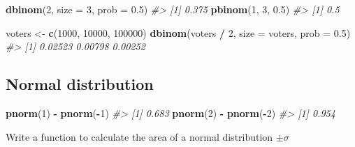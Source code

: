\documentclass[]{book}
\newenvironment{Shaded}{\begin{snugshade}}{\end{snugshade}}
\newcommand{\CommentTok}[1]{\textcolor[rgb]{0.56,0.35,0.01}{\textit{#1}}}
\newcommand{\DataTypeTok}[1]{\textcolor[rgb]{0.13,0.29,0.53}{#1}}
\newcommand{\DecValTok}[1]{\textcolor[rgb]{0.00,0.00,0.81}{#1}}
\newcommand{\FloatTok}[1]{\textcolor[rgb]{0.00,0.00,0.81}{#1}}
\newcommand{\KeywordTok}[1]{\textcolor[rgb]{0.13,0.29,0.53}{\textbf{#1}}}
\newcommand{\NormalTok}[1]{#1}
\newcommand{\OperatorTok}[1]{\textcolor[rgb]{0.81,0.36,0.00}{\textbf{#1}}}
\newcommand{\StringTok}[1]{\textcolor[rgb]{0.31,0.60,0.02}{#1}}
\theoremstyle{definition}
\theoremstyle{definition}
\theoremstyle{definition}
\theoremstyle{remark}
\begin{document}
\begin{Shaded}
\begin{Highlighting}[]
\KeywordTok{dbinom}\NormalTok{(}\DecValTok{2}\NormalTok{, }\DataTypeTok{size =} \DecValTok{3}\NormalTok{, }\DataTypeTok{prob =} \FloatTok{0.5}\NormalTok{)}
\CommentTok{#> [1] 0.375}
\KeywordTok{pbinom}\NormalTok{(}\DecValTok{1}\NormalTok{, }\DecValTok{3}\NormalTok{, }\FloatTok{0.5}\NormalTok{)}
\CommentTok{#> [1] 0.5}
\end{Highlighting}
\end{Shaded}

\begin{Shaded}
\begin{Highlighting}[]
\NormalTok{voters <-}\StringTok{ }\KeywordTok{c}\NormalTok{(}\DecValTok{1000}\NormalTok{, }\DecValTok{10000}\NormalTok{, }\DecValTok{100000}\NormalTok{)}
\KeywordTok{dbinom}\NormalTok{(voters }\OperatorTok{/}\StringTok{ }\DecValTok{2}\NormalTok{, }\DataTypeTok{size =}\NormalTok{ voters, }\DataTypeTok{prob =} \FloatTok{0.5}\NormalTok{)}
\CommentTok{#> [1] 0.02523 0.00798 0.00252}
\end{Highlighting}
\end{Shaded}

\hypertarget{normal-distribution}{%
\subsection{Normal distribution}\label{normal-distribution}}

\begin{Shaded}
\begin{Highlighting}[]
\KeywordTok{pnorm}\NormalTok{(}\DecValTok{1}\NormalTok{) }\OperatorTok{-}\StringTok{ }\KeywordTok{pnorm}\NormalTok{(}\OperatorTok{-}\DecValTok{1}\NormalTok{)}
\CommentTok{#> [1] 0.683}
\KeywordTok{pnorm}\NormalTok{(}\DecValTok{2}\NormalTok{) }\OperatorTok{-}\StringTok{ }\KeywordTok{pnorm}\NormalTok{(}\OperatorTok{-}\DecValTok{2}\NormalTok{)}
\CommentTok{#> [1] 0.954}
\end{Highlighting}
\end{Shaded}

Write a function to calculate the area of a normal distribution
\(\pm \sigma\)
\end{document}
